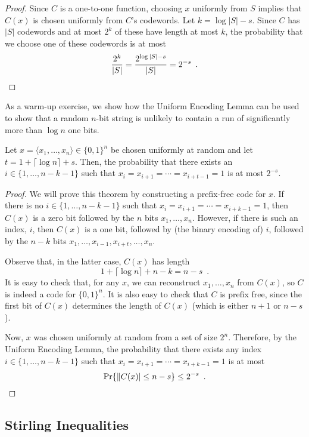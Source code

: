\documentclass[lotsofwhite]{patmorin}
\begin{document}
\begin{proof}
  Since $C$ is a one-to-one function, choosing $x$ uniformly from $S$
  implies that $C(x)$ is chosen uniformly from $C$'s codewords. Let
  $k=\log|S|-s$. Since $C$ has $|S|$ codewords and at most $2^{k}$ of these
  have length at most $k$, the probability that we choose one of these 
  codewords is at most
  \[   \frac{2^k}{|S|} = \frac{2^{\log|S|-s}}{|S|} = 2^{-s} \enspace . \qedhere \]
\end{proof}


As a warm-up exercise, we show how the Uniform Encoding Lemma can be
used to show that a random $n$-bit string is unlikely to contain a run
of significantly more than $\log n$ one bits.

\begin{thm}
  Let $x=\langle x_1,\ldots,x_n\rangle\in\{0,1\}^n$ be chosen
  uniformly at random and let $t=1+\lceil\log n\rceil + s$. Then, the
  probability that there exists an $i\in\{1,\ldots,n-k-1\}$ such that
  $x_i=x_{i+1}=\cdots=x_{i+t-1}=1$ is at most $2^{-s}$.
\end{thm}

\begin{proof}
  We will prove this theorem by constructing a prefix-free code
  for $x$. If there is no $i\in\{1,\ldots,n-k-1\}$ such that
  $x_i=x_{i+1}=\cdots=x_{i+k-1}=1$, then $C(x)$ is a zero bit followed
  by the $n$ bits $x_1,\ldots,x_n$.  However, if there is such an index,
  $i$, then $C(x)$ is a one bit, followed by (the binary encoding of)
  $i$, followed by the $n-k$ bits $x_1,\ldots,x_{i-1},x_{i+t},\ldots,x_n$.

  Observe that, in the latter case, $C(x)$ has length 
  \[
      1 + \lceil\log n\rceil + n - k = n-s \enspace .
  \]
  It is easy to check that, for any $x$, we can reconstruct
  $x_1,\ldots,x_n$ from $C(x)$, so $C$ is indeed a code for $\{0,1\}^n$.
  It is also easy to check that $C$ is prefix free, since the first bit of
  $C(x)$ determines the length of $C(x)$ (which is either $n+1$ or $n-s$).

  Now, $x$ was chosen uniformly at random from a set of size $2^{n}$.
  Therefore, by the Uniform Encoding Lemma, the probability
  that there exists any index $i\in\{1,\ldots,n-k-1\}$ such that
  $x_i=x_{i+1}=\cdots=x_{i+k-1}=1$ is at most
  \[
      \Pr\{\|C(x)|\le n-s\} \le 2^{-s} \enspace . \qedhere 
  \]
\end{proof}

\subsection{Stirling Inequalities}
\end{document}

